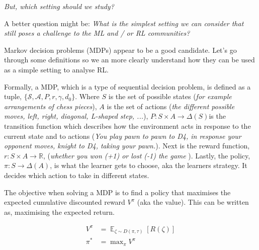 \begin{displayquote}
  \textsl{But, which setting should we study?\footnotemark[26]}
\end{displayquote}


\begin{displayquote}
  A better question might be: \textsl{What is the simplest setting we can
  consider that still poses a challenge to the ML and / or RL communities?}
\end{displayquote}

Markov decision problems (MDPs) appear to be a good candidate. Let's go through some definitions so we an more clearly understand how they can be used as a
simple setting to analyse RL.

Formally, a MDP, which is a type of sequential decision problem, is defined
as a tuple, $\{\mathcal S, \mathcal A, P,r, \gamma, d_0\}$.
Where $S$ is the set of possible states (\textit{for example arrangements of chess pieces}),
$A$ is the set of actions (\textit{the different possible moves, left,
right, diagonal, L-shaped step, ...}),  $P: S \times A \to \Delta(S)$\footnotemark[16]
is the transition function which describes how the environment acts in response
to the current state and to actions (\textit{You play pawn to pawn to D4, in response your
opponent moves, knight to D4, taking your pawn.}). Next is the reward function, $r: S\times A \to \mathbb R$,
(\textit{whether you won (+1) or lost (-1) the game }).
Lastly, the policy, $\pi: S \to \Delta(A)$, is what the learner gets to choose, aka the learners strategy.
It decides which action to take in different states.


\vspace{5mm}

The objective when solving a MDP is to find a policy
that maximises the expected cumulative discounted reward $V^{\pi}$ (aka the value). This
can be written as, maximising the expected return.

\begin{align*}
V^{\pi} &= \mathop{\mathbb E}_{\zeta \sim D(\pi, \tau)} [R(\zeta)] \tag{state value}\label{state-value}\\
\pi^{* } &= \mathop{\text{max}}_{\pi}V^{\pi}
\end{align*}


